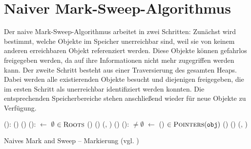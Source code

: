 \section{Naiver Mark-Sweep-Algorithmus}
\label{sec:naive-mark-sweep}
Der naive Mark-Sweep-Algorithmus arbeitet in zwei Schritten:
Zunächst wird bestimmt, welche Objekte im Speicher unerreichbar sind, weil sie von keinem anderen erreichbaren Objekt referenziert werden.
Diese Objekte können gefahrlos freigegeben werden, da auf ihre Informationen nicht mehr zugegriffen werden kann.
Der zweite Schritt besteht aus einer Traversierung des gesamten Heaps.
Dabei werden alle existierenden Objekte besucht und diejenigen freigegeben, die im ersten Schritt als unerreichbar identifiziert werden konnten.
Die entsprechenden Speicherbereiche stehen anschließend wieder für neue Objekte zu Verfügung.

\begin{algorithm}
\begin{algorithmic}[1]
	\State {}():
	\State \quad {}()
	\State \quad {}()
	\Statex
	\State {}():
	\State \quad {} $\gets$ $\emptyset$				
	\State \quad \FOREACH {} $\in \textsc{Roots}$		
	\State \quad \quad \IF \NOT {}()
	\State \quad \quad \quad {}()	
	\State \quad \quad \quad {}(, )	
	\State \quad \quad \quad {}()			
	\Statex
	\State {}():
	\State \quad \WHILE {} $\neq \emptyset$
	\State \quad \quad {} $\gets$ ()			
	\State \quad \quad \FOREACH {} $\in \textsc{Pointers}(\texttt{obj})$	
	\State \quad \quad \quad \IF \NOT {}()
	\State \quad \quad \quad \quad {}()	
	\State \quad \quad \quad \quad {}(, )
\end{algorithmic}
\caption[Naives Mark and Sweep -- Markierung]{Naives Mark and Sweep -- Markierung (vgl. \cite[Kap. 2.2]{jones-lins})}
\label{algo:naive-mark}
\end{algorithm}

